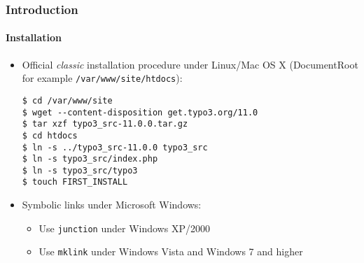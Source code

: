 %

\begin{frame}[fragile]
	\frametitle{Introduction}
	\framesubtitle{Installation}


	\begin{itemize}
		\item Official \textit{classic} installation procedure under Linux/Mac OS X\newline
			(DocumentRoot for example \texttt{/var/www/site/htdocs}):
\begin{lstlisting}
$ cd /var/www/site
$ wget --content-disposition get.typo3.org/11.0
$ tar xzf typo3_src-11.0.0.tar.gz
$ cd htdocs
$ ln -s ../typo3_src-11.0.0 typo3_src
$ ln -s typo3_src/index.php
$ ln -s typo3_src/typo3
$ touch FIRST_INSTALL
\end{lstlisting}

		\item Symbolic links under Microsoft Windows:

			\begin{itemize}
				\item Use \texttt{junction} under Windows XP/2000
				\item Use \texttt{mklink} under Windows Vista and Windows 7 and higher
			\end{itemize}

	\end{itemize}
\end{frame}

